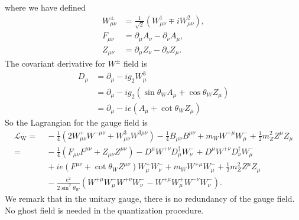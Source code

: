 where we have defined 
\begin{equation}
\begin{aligned}
	W^\pm_{\mu\nu} &= \frac{1}{\sqrt 2} (W^1_{\mu\nu} \mp i W^2_{\mu\nu}), \\
	F_{\mu\nu} &= \partial_\mu A_\nu - \partial_\nu A_\mu, \\
	Z_{\mu\nu} &= \partial_\mu Z_\nu - \partial_\nu Z_\mu.
\end{aligned}
\end{equation}
The covariant derivative for $W^\pm$ field is
\begin{equation}
\begin{aligned}
	D_\mu &= \partial_\mu -i g_2 W^3_\mu \\
	&= \partial_\mu -i g_2 \left(\sin{\theta_W}A_\mu + \cos{\theta_W} Z_\mu \right) \\
	&= \partial_\mu -i e \left(A_\mu + \cot{\theta_W} Z_\mu \right)
\end{aligned}
\end{equation}
So the Lagrangian for the gauge field is
\begin{equation}
\begin{aligned}
	\mathcal L_\mathrm{W}
	=&\ -\frac{1}{4}(2W_{\mu\nu}^+ W^{-\mu\nu} + W_{\mu\nu}^3 W^{3\mu\nu}) -\frac{1}{4} B_{\mu\nu}B^{\mu\nu} + m_W W^{+\mu} W_\mu^- + \frac{1}{2}m_Z^2 Z^\mu Z_\mu \\
	=&\ -\frac{1}{4}(F_{\mu\nu}F^{\mu\nu} + Z_{\mu\nu} Z^{\mu\nu}) - D^{\mu} W^{+\nu} D^\dagger_\mu W_\nu^- + D^\mu W^{+\nu} D^\dagger_\nu W^-_\mu \\
	&\ +ie (F^{\mu\nu} + \cot{\theta_W} Z^{\mu\nu})W_\mu^+ W_\nu^- + m_W W^{+\mu} W_\mu^- + \frac{1}{2}m_Z^2 Z^\mu Z_\mu \\
	&\ -\frac{e^2}{2\sin^2{\theta_W}} \left(W^{+\mu}W^-_\mu W^{+\nu}W^-_\nu - W^{+\mu}W^+_\mu W^{-\nu}W^-_\nu \right).
\end{aligned}
\end{equation}
We remark that in the unitary gauge, there is no redundancy of the gauge field.
No ghost field is needed in the quantization procedure.


